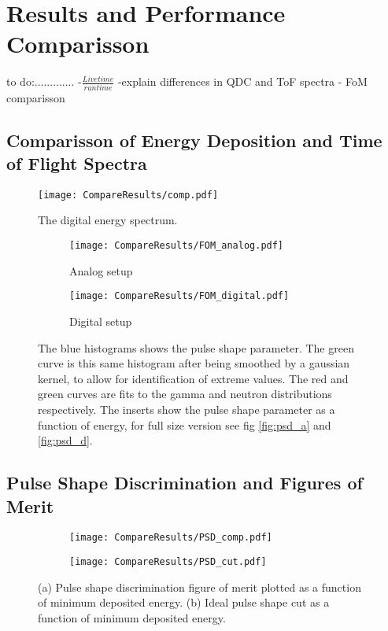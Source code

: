\documentclass[main.tex]{subfiles}
\begin{document}
\section{Results and Performance Comparisson}\label{sec:results}
to do:.............
\newline
-$\frac{Livetime}{runtime}$
\newline -explain differences in QDC and ToF spectra
\newline- FoM comparisson

\subsection{Comparisson of Energy Deposition and Time of Flight Spectra}
\begin{figure}[h]
    \centering
        \texttt{[image: CompareResults/comp.pdf]}
        \caption{The digital energy spectrum.}
    \label{fig:AD_comp}
\end{figure}

\begin{figure}[ht]
	\begin{subfigure}[b]{\textwidth}
	    \centering
    	    \texttt{[image: CompareResults/FOM\_analog.pdf]}
        	\caption{Analog setup}
	    \label{fig:fom_analog} 
	\end{subfigure}
	\begin{subfigure}[b]{\textwidth}
    	\centering
        	\texttt{[image: CompareResults/FOM\_digital.pdf]}
        	\caption{Digital setup}
    	\label{fig:fom_digital} 
    \end{subfigure}
    \caption{The blue histograms shows the pulse shape parameter. The green curve is this same histogram after being smoothed by a gaussian kernel, to allow for identification of extreme values. The red and green curves are fits to the gamma and neutron distributions respectively. The inserts show the pulse shape parameter as a function of energy, for full size version see fig \ref{fig:psd_a} and \ref{fig:psd_d}. }
\end{figure}

\subsection{Pulse Shape Discrimination and Figures of Merit}

\begin{figure}[ht]
	\begin{subfigure}[b]{\textwidth}
	    \centering
    	\texttt{[image: CompareResults/PSD\_comp.pdf]}
        \caption{}
	    \label{fig:psd_fom_trend} 
	\end{subfigure}
	\begin{subfigure}[b]{\textwidth}
    	\centering
        \texttt{[image: CompareResults/PSD\_cut.pdf]}
        \caption{}
    	\label{fig:psd_cut_trend} 
    \end{subfigure}
    \caption{(a) Pulse shape discrimination figure of merit plotted as a function 	of minimum deposited energy. (b) Ideal pulse shape cut as a function of minimum deposited energy.}
\end{figure}
\end{document}
